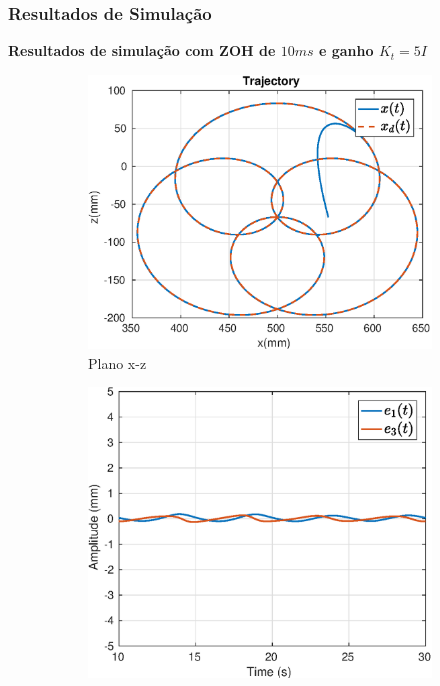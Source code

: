 \documentclass{beamer}
\begin{document}
\begin{frame}
\frametitle{Resultados de Simulação}
\textbf{Resultados de simulação com ZOH de $10ms$ e ganho $K_t = 5 I$}
\begin{figure}[H]
\centering
\begin{subfigure}{.5\textwidth}
  \centering
  \includegraphics[width=\linewidth]{./img/simul_delay_zoh5/traj.eps}
  \caption{Plano x-z}
\end{subfigure}%
\begin{subfigure}{.5\textwidth}
  \centering
  \includegraphics[width=\linewidth]{./img/simul_delay_zoh5/error.eps}
\end{subfigure}
\end{figure}%
\end{frame}
\end{document}

